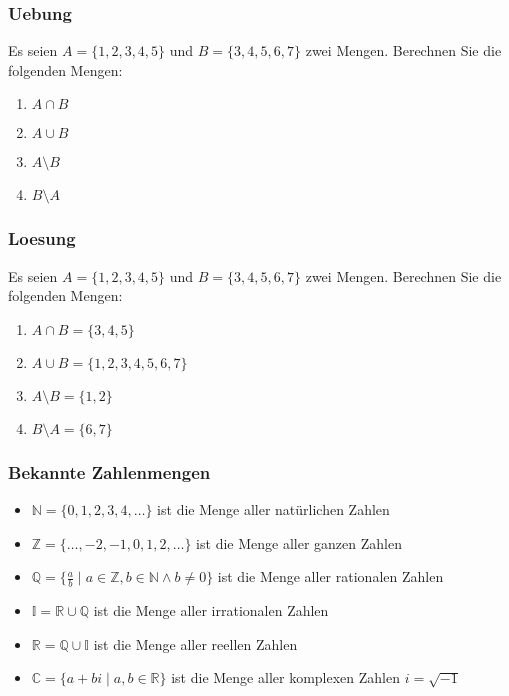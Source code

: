 \begin{frame}
    \frametitle{Uebung}
    Es seien $A = \{1,2,3,4,5\}$ und $B = \{3,4,5,6,7\}$ zwei Mengen.
    Berechnen Sie die folgenden Mengen:
    \begin{enumerate}
        \item $A \cap B$
        \item $A \cup B$
        \item $A \setminus B$
        \item $B \setminus A$
    \end{enumerate}
\end{frame}

\begin{frame}
    \frametitle{Loesung}
    Es seien $A = \{1,2,3,4,5\}$ und $B = \{3,4,5,6,7\}$ zwei Mengen.
    Berechnen Sie die folgenden Mengen:
    \begin{enumerate}
        \item $A \cap B = \{3,4,5\}$
        \item $A \cup B = \{1,2,3,4,5,6,7\}$
        \item $A \setminus B = \{1,2\}$
        \item $B \setminus A = \{6,7\}$
    \end{enumerate}
\end{frame}

\begin{frame}
    \frametitle{Bekannte Zahlenmengen}
    \begin{itemize}
        \item $\mathbb{N} = \{0,1,2,3,4, \dots\}$ ist die Menge aller natürlichen Zahlen
        \item $\mathbb{Z} = \{\dots, -2, -1, 0, 1, 2, \dots\}$ ist die Menge aller ganzen Zahlen
        \item $\mathbb{Q} = \{\frac{a}{b} \mid a \in \mathbb{Z}, b \in \mathbb{N} \wedge b \neq 0\}$ ist die Menge aller rationalen Zahlen
        \item $\mathbb{I} = \mathbb{R} \cup \mathbb{Q}$ ist die Menge aller irrationalen Zahlen
        \item $\mathbb{R} = \mathbb{Q} \cup \mathbb{I}$ ist die Menge aller reellen Zahlen
        \item $\mathbb{C} = \{a + bi \mid a, b \in \mathbb{R}\}$ ist die Menge aller komplexen Zahlen $i = \sqrt{-1}$
    \end{itemize}
\end{frame}
